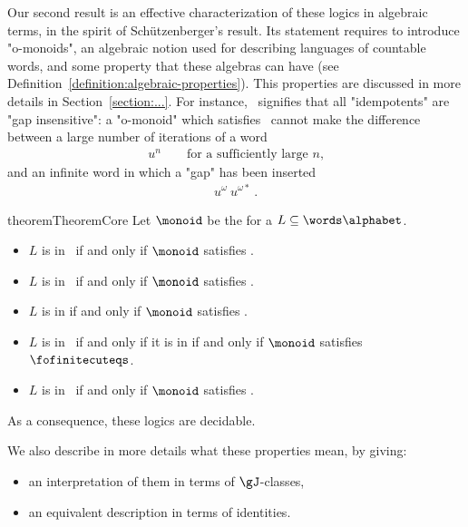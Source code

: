 Our second result is an effective characterization of these logics in algebraic terms, in the spirit of Schützenberger's result.
Its statement requires to introduce "o-monoids", an algebraic notion used for describing languages of countable words, and 
some property that these algebras can have (see Definition~\ref{definition:algebraic-properties}). This properties are discussed in more details in Section~\ref{section:...}. For instance, \eigi\ signifies that all "idempotents" are "gap insensitive": a "o-monoid" which satisfies \eigi\ cannot make the difference between a large number of iterations of a word
\begin{align*}
	u^n\qquad\text{for a sufficiently large~$n$,}
\end{align*}
and an infinite word in which a "gap" has been inserted
\begin{align*}
	u^\omega\ u^{\omega*}\ .
\end{align*}
\begin{restatable}{theorem}{TheoremCore}
	Let $\monoid$ be the  for a  $L\subseteq\words\alphabet$.
	\begin{itemize}
		\item $L$ is  in \fo\ if and only if $\monoid$ satisfies \foeqs.
		\item $L$ is  in \focut\ if and only if $\monoid$ satisfies \focuteqs.
		\item $L$ is  in \fofinite if and only if $\monoid$ satisfies \fofiniteeqs.
		\item $L$ is  in \fofinitecut\ if and only if it is  in \foordinal
			if and only if $\monoid$ satisfies $\fofinitecuteqs$.
		\item $L$ is  in \foscattered\ if and only if $\monoid$ satisfies \foscatteredeqs.
	\end{itemize}
	As a consequence, these logics are decidable.
\end{restatable}
We also describe in more details what these properties mean, by giving:
\begin{theorem}
	\begin{itemize}
	\item an interpretation of them in terms of $\gJ$-classes,
	\item an equivalent description in terms of identities.
	\end{itemize}
\end{theorem}


